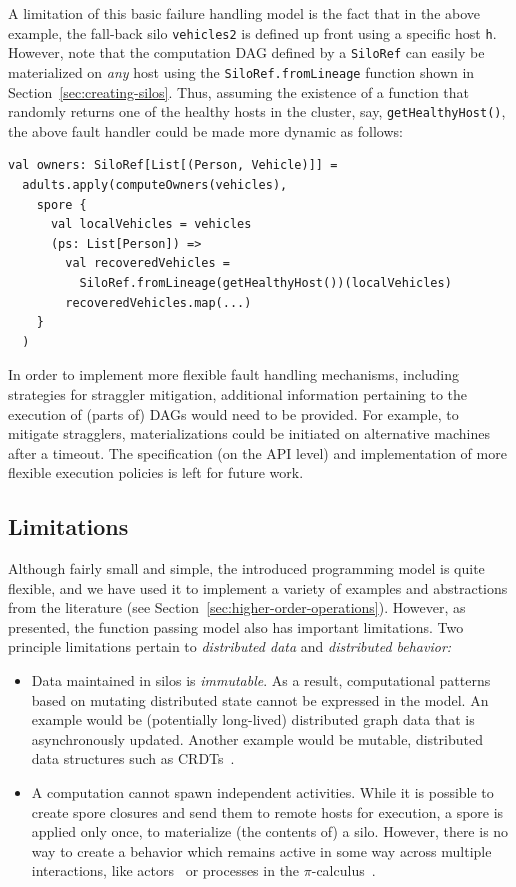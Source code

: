 \documentclass{jfp1}
\begin{document}
A limitation of this basic failure handling model is the fact that in
the above example, the fall-back silo \verb|vehicles2| is defined up
front using a specific host \verb|h|. However, note that the
computation DAG defined by a \verb|SiloRef| can easily be materialized
on {\em any} host using the \verb|SiloRef.fromLineage| function shown
in Section~\ref{sec:creating-silos}. Thus, assuming the existence of a
function that randomly returns one of the healthy hosts in the
cluster, say, \verb|getHealthyHost()|, the above fault handler could
be made more dynamic as follows:

\begin{lstlisting}
val owners: SiloRef[List[(Person, Vehicle)]] =
  adults.apply(computeOwners(vehicles),
    spore {
      val localVehicles = vehicles
      (ps: List[Person]) =>
        val recoveredVehicles =
          SiloRef.fromLineage(getHealthyHost())(localVehicles)
        recoveredVehicles.map(...)
    }
  )
\end{lstlisting}

In order to implement more flexible fault handling mechanisms,
including strategies for straggler mitigation, additional information
pertaining to the execution of (parts of) DAGs would need to be
provided. For example, to mitigate stragglers, materializations could
be initiated on alternative machines after a timeout. The
specification (on the API level) and implementation of more flexible
execution policies is left for future work.

\subsection{Limitations}

Although fairly small and simple, the introduced programming model is
quite flexible, and we have used it to implement a variety of examples
and abstractions from the literature (see Section~\ref{sec:higher-order-operations}).
However, as presented, the function passing model also has important
limitations. Two principle limitations pertain to {\em distributed
  data} and {\em distributed behavior:}

\begin{itemize}

\item Data maintained in silos is {\em immutable}. As a result,
  computational patterns based on mutating distributed state cannot be
  expressed in the model. An example would be (potentially long-lived)
  distributed graph data that is asynchronously updated.  Another
  example would be mutable, distributed data structures such as
  CRDTs~\cite{ShapiroPBZ11}.

\item A computation cannot spawn independent activities. While it is
  possible to create spore closures and send them to remote hosts for
  execution, a spore is applied only once, to materialize (the
  contents of) a silo. However, there is no way to create a behavior
  which remains active in some way across multiple interactions, like
  actors~\cite{Actors} or processes in the
  $\pi$-calculus~\cite{milner:92a}.

\end{itemize}
\end{document}
